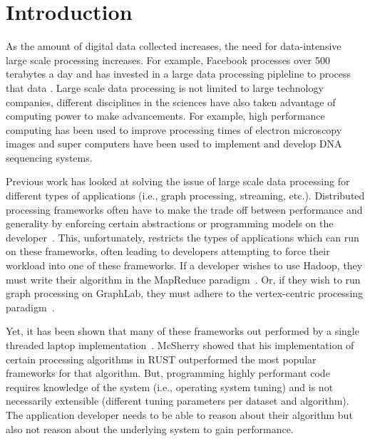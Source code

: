 \section{Introduction} 
\label{sec:intro}
As the amount of digital data collected increases, the need for data-intensive
large scale processing increases. For example, Facebook processes over 500
terabytes a day and has invested in a large data processing pipleline to process
that data 
. 
Large scale data processing is not limited to large technology companies,
different disciplines in the sciences have also taken advantage of computing
power to make advancements. For example, high performance computing has been
used to improve processing times of electron microscopy images and super
computers have been used to implement and develop DNA sequencing systems.

Previous work has looked at solving the issue of large scale data processing for
different types of applications (i.e., graph processing, streaming, etc.).
Distributed processing frameworks often have to make the trade off between
performance and generality by enforcing certain abstractions or programming
models on the developer~\cite{Dean2004,Low2010,Murray2013}. 
This, unfortunately, restricts the types of applications which can run on these
frameworks, often leading to developers attempting to force their workload into
one of these frameworks. If a developer wishes to use Hadoop, they must write
their algorithm in the MapReduce paradigm~\cite{Dean2004}. Or, if they wish to
run graph processing on GraphLab, they must adhere to the vertex-centric
processing paradigm~\cite{Low2010}.

Yet, it has been shown that many of these frameworks out performed by a single
threaded laptop implementation~\cite{189908}. McSherry showed that his
implementation of certain processing algorithms in RUST outperformed the most
popular frameworks for that algorithm. But, programming highly performant code
requires knowledge of the system (i.e., operating system tuning) and is not
necessarily extensible  (different tuning parameters per dataset and algorithm).
The application developer needs to be able to reason about their algorithm but
also not reason about the underlying system to gain performance. 

